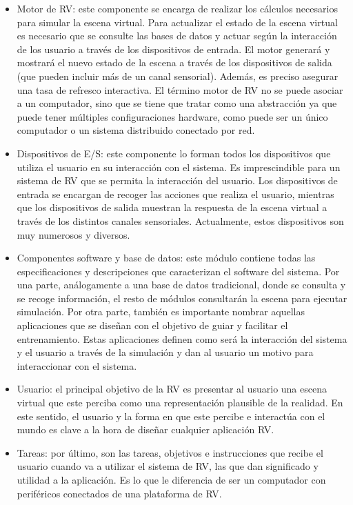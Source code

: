 \begin{itemize}
    \item Motor de \ac{RV}: este componente se encarga de realizar los cálculos necesarios para simular la escena virtual. Para actualizar el estado de la escena virtual es necesario que se consulte las bases de datos  y actuar según la interacción de los usuario a través de los dispositivos de entrada. El motor generará y mostrará el nuevo estado de la escena a través de los dispositivos de salida (que pueden incluir más de un canal sensorial). Además, es preciso asegurar una tasa de refresco interactiva. El término motor de \ac{RV} no se puede asociar a un computador, sino que se tiene que tratar como una abstracción ya que puede tener múltiples configuraciones hardware, como puede ser un único computador o un sistema distribuido conectado por red.
    \item Dispositivos de \ac{E/S}: este componente lo forman todos los dispositivos que utiliza el usuario en su interacción con el sistema. Es imprescindible para un sistema de \ac{RV}  que se permita la interacción del usuario. Los dispositivos de entrada se encargan de recoger las acciones que realiza el usuario, mientras que los dispositivos de salida muestran la respuesta de la escena virtual a través de los distintos canales sensoriales. Actualmente, estos dispositivos son muy numerosos y diversos.
    \item Componentes software y base de datos: este módulo contiene todas las especificaciones y descripciones que caracterizan el software del sistema. Por una parte, análogamente a una base de datos tradicional, donde se consulta y se recoge información, el resto de módulos consultarán la escena para ejecutar simulación.
    Por otra parte, también es importante nombrar aquellas aplicaciones que se diseñan con el objetivo de guiar y facilitar el entrenamiento. Estas aplicaciones definen como será la interacción del sistema y el usuario a través de la simulación y dan al usuario un motivo para interaccionar con el sistema.%
    \item Usuario: el principal objetivo de la \ac{RV} es presentar al usuario una escena virtual que este perciba como una representación plausible de la realidad. En este sentido, el usuario y la forma en que este percibe e interactúa con el mundo es clave a la hora de diseñar cualquier aplicación \ac{RV}.
    \item Tareas: por último, son las tareas, objetivos e instrucciones que recibe el usuario cuando va a utilizar el sistema de \ac{RV}, las que dan significado y utilidad a la aplicación. Es lo que le diferencia de ser un computador con periféricos conectados de una plataforma de \ac{RV}.
\end{itemize}


